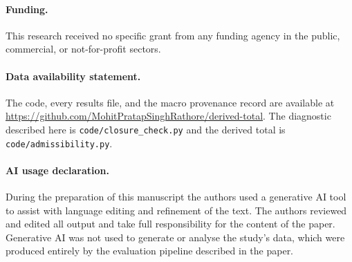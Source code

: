 \documentclass[11pt]{article}
\newif\ifanon
\begin{document}
\paragraph{Funding.}
\ifanon
Removed for double-anonymous peer review.
\else
This research received no specific grant from any funding agency in the public,
commercial, or not-for-profit sectors.
\fi

\paragraph{Data availability statement.}
\ifanon
The code, the measurement artefacts, and the generated manuscript sources will be
made available upon acceptance.
\else
The code, every results file, and the macro provenance record are available at
\url{https://github.com/MohitPratapSinghRathore/derived-total}. The diagnostic
described here is \texttt{code/closure\_check.py} and the derived total is
\texttt{code/admissibility.py}.
\fi

\paragraph{AI usage declaration.}
During the preparation of this manuscript the authors used a generative AI tool to
assist with language editing and refinement of the text. The authors reviewed and
edited all output and take full responsibility for the content of the paper.
Generative AI was not used to generate or analyse the study's data, which were
produced entirely by the evaluation pipeline described in the paper.



\end{document}

